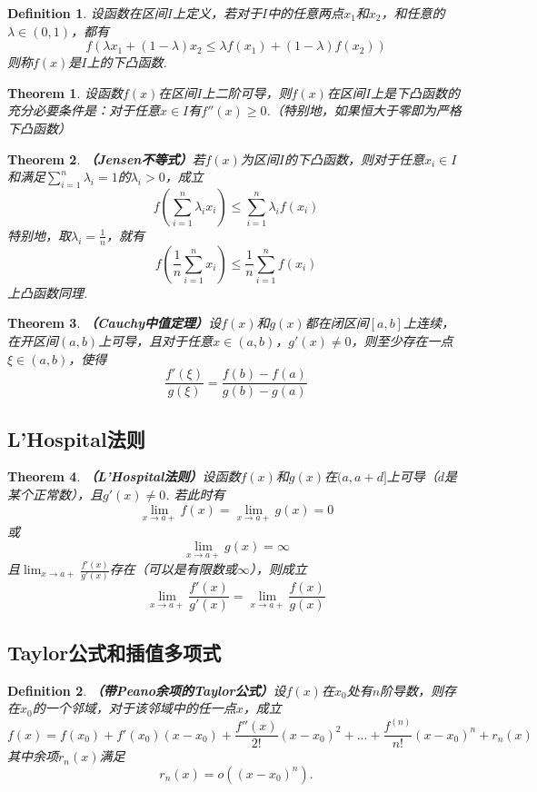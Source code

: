 \documentclass[9pt]{ctexart}
\newtheorem{definition}{Definition}[section]
\newtheorem{theorem}{Theorem}[section]
\begin{document}
\begin{definition}
    设函数在区间$I$上定义，若对于$I$中的任意两点$x_1$和$x_2$，和任意的$\lambda\in(0,1)$，都有
    \[f(\lambda x_1+(1-\lambda)x_2\leq \lambda f(x_1)+(1-\lambda)f(x_2))\]
    则称$f(x)$是$I$上的下凸函数.
\end{definition}

\begin{theorem}
    设函数$f(x)$在区间$I$上二阶可导，则$f(x)$在区间$I$上是下凸函数的充分必要条件是：对于任意$x\in I$有$f''(x)\geq 0$.（特别地，如果恒大于零即为严格下凸函数）
\end{theorem}

\begin{theorem}
    \textbf{（Jensen不等式）}若$f(x)$为区间$I$的下凸函数，则对于任意$x_i\in I$和满足$\sum_{i=1}^n\lambda_i=1$的$\lambda_i>0$，成立
    \[f(\sum_{i=1}^n\lambda_ix_i)\leq\sum_{i=1}^n\lambda_if(x_i)\]
    特别地，取$\lambda_i=\frac{1}{n}$，就有
    \[f(\frac{1}{n}\sum_{i=1}^nx_i)\leq\frac{1}{n}\sum_{i=1}^nf(x_i)\]
    上凸函数同理.
\end{theorem}

\begin{theorem}
    \textbf{（Cauchy中值定理）}设$f(x)$和$g(x)$都在闭区间$[a,b]$上连续，在开区间$(a,b)$上可导，且对于任意$x\in(a,b)$，$g'(x)\neq 0$，则至少存在一点$\xi\in(a,b)$，使得
    \[\frac{f'(\xi)}{g(\xi)}=\frac{f(b)-f(a)}{g(b)-g(a)}\]
\end{theorem}

\subsection{L'Hospital法则}

\begin{theorem}
    \textbf{（L'Hospital法则）}设函数$f(x)$和$g(x)$在$(a,a+d]$上可导（$d$是某个正常数），且$g'(x)\neq 0$. 若此时有
    \[\lim_{x\to a+}f(x)=\lim_{x\to a+}g(x)=0\]
    或
    \[\lim_{x\to a+}g(x)=\infty\]
    且$\lim_{x\to a+}\frac{f'(x)}{g'(x)}$存在（可以是有限数或$\infty$），则成立
    \[\lim_{x\to a+}\frac{f'(x)}{g'(x)}=\lim_{x\to a+}\frac{f(x)}{g(x)}\]
\end{theorem}
\subsection{Taylor公式和插值多项式}
\begin{definition}
    \textbf{（带Peano余项的Taylor公式）}设$f(x)$在$x_0$处有$n$阶导数，则存在$x_0$的一个邻域，对于该邻域中的任一点$x$，成立
    \[f(x)=f(x_0)+f'(x_0)(x-x_0)+\frac{f''(x)}{2!}(x-x_0)^2+...+\frac{f^{(n)}}{n!}(x-x_0)^n+r_n(x)\]
    其中余项$r_n(x)$满足
    \[r_n(x)=o({(x-x_0)^n}).\]
\end{definition}
\end{document}
